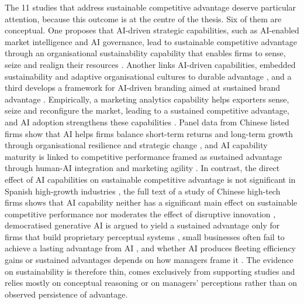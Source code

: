 The 11 studies that address sustainable competitive advantage deserve particular attention, because this outcome is at the centre of the thesis. Six of them are conceptual. One proposes that AI-driven strategic capabilities, such as AI-enabled market intelligence and AI governance, lead to sustainable competitive advantage through an organisational sustainability capability that enables firms to sense, seize and realign their resources \parencite[1]{slrR001}. Another links AI-driven capabilities, embedded sustainability and adaptive organisational cultures to durable advantage \parencite[1]{slrR026}, and a third develops a framework for AI-driven branding aimed at sustained brand advantage \parencite[1]{slrR170}. Empirically, a marketing analytics capability helps exporters sense, seize and reconfigure the market, leading to a sustained competitive advantage, and AI adoption strengthens these capabilities \parencite[240]{hossain2022}. Panel data from Chinese listed firms show that AI helps firms balance short-term returns and long-term growth through organisational resilience and strategic change \parencite[1]{liang2026}, and AI capability maturity is linked to competitive performance framed as sustained advantage through human-AI integration and marketing agility \parencite[1]{slrR149}. In contrast, the direct effect of AI capabilities on sustainable competitive advantage is not significant in Spanish high-growth industries \parencite[1]{slrR003}, the full text of a study of Chinese high-tech firms shows that AI capability neither has a significant main effect on sustainable competitive performance nor moderates the effect of disruptive innovation \parencite[1]{slrR059}, democratised generative AI is argued to yield a sustained advantage only for firms that build proprietary perceptual systems \parencite[583]{cui2024}, small businesses often fail to achieve a lasting advantage from AI \parencite[1]{slrR077}, and whether AI produces fleeting efficiency gains or sustained advantages depends on how managers frame it \parencite[1]{wu2026}. The evidence on sustainability is therefore thin, comes exclusively from supporting studies and relies mostly on conceptual reasoning or on managers' perceptions rather than on observed persistence of advantage.

